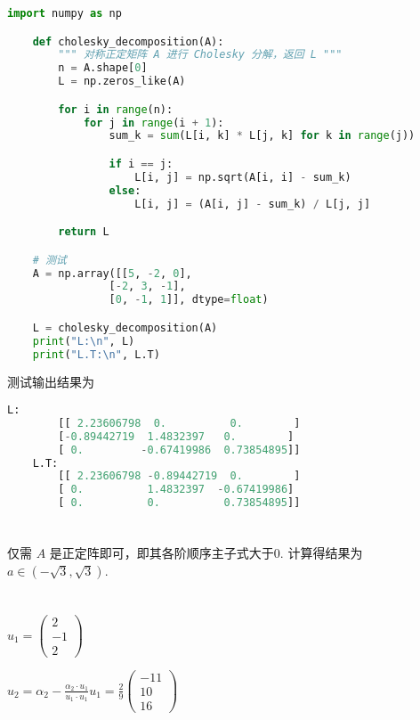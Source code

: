 \documentclass{article}
\begin{document}
\begin{lstlisting}[style=codestyle, language=Python, title=Cholesky 分解代码]
    import numpy as np

    def cholesky_decomposition(A):
        """ 对称正定矩阵 A 进行 Cholesky 分解，返回 L """
        n = A.shape[0]
        L = np.zeros_like(A)

        for i in range(n):
            for j in range(i + 1):
                sum_k = sum(L[i, k] * L[j, k] for k in range(j))

                if i == j:
                    L[i, j] = np.sqrt(A[i, i] - sum_k)
                else:
                    L[i, j] = (A[i, j] - sum_k) / L[j, j]

        return L

    # 测试
    A = np.array([[5, -2, 0],
                [-2, 3, -1],
                [0, -1, 1]], dtype=float)

    L = cholesky_decomposition(A)
    print("L:\n", L)
    print("L.T:\n", L.T)    
\end{lstlisting}

测试输出结果为

\begin{lstlisting}[style=codestyle, language=Python,title=输出结果]
    L:
        [[ 2.23606798  0.          0.        ]
        [-0.89442719  1.4832397   0.        ]
        [ 0.         -0.67419986  0.73854895]]
    L.T:
        [[ 2.23606798 -0.89442719  0.        ]
        [ 0.          1.4832397  -0.67419986]
        [ 0.          0.          0.73854895]]
\end{lstlisting}

\section{}

仅需 $A$ 是正定阵即可，即其各阶顺序主子式大于0. 计算得结果为 $a \in (-\sqrt{3}, \sqrt{3})$.

\section{}

$u_1 = \begin{pmatrix}
    2 \\ -1 \\ 2
\end{pmatrix}$

$u_2 = \alpha_2 - \frac{\alpha_2 \cdot u_1}{u_1 \cdot u_1}u_1 = \frac{2}{9}\begin{pmatrix}
    -11 \\ 10 \\ 16
\end{pmatrix}$ \\
\end{document}
